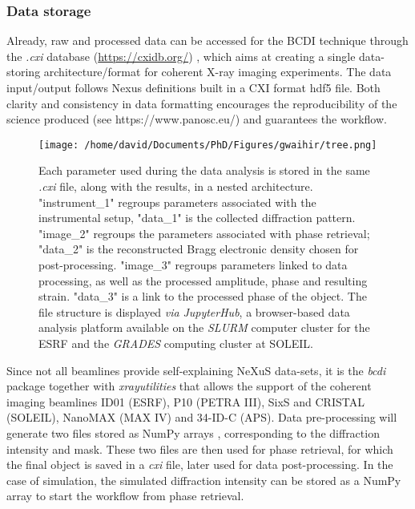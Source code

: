 \subsubsection{Data storage}

Already, raw and processed data can be accessed for the BCDI technique through the \textit{.cxi} database (\url{https://cxidb.org/}) \parencite{Maia2012}, which aims at creating a single data-storing architecture/format for coherent X-ray imaging experiments.
The data input/output follows Nexus definitions \parencite{Konnecke2015} built in a CXI format hdf5 file.
Both clarity and consistency in data formatting encourages the reproducibility of the science produced (see https://www.panosc.eu/) and guarantees the workflow.

\begin{figure}[!htb]
    \centering
    \texttt{[image: /home/david/Documents/PhD/Figures/gwaihir/tree.png]}
    \caption{
    Each parameter used during the data analysis is stored in the same \textit{.cxi} file, along with the results, in a  nested architecture.
    "instrument\_1" regroups parameters associated with the instrumental setup, "data\_1" is the collected diffraction pattern.
    "image\_2" regroups the parameters associated with phase retrieval; "data\_2" is the reconstructed Bragg electronic density chosen for post-processing.
    "image\_3" regroups parameters linked to data processing, as well as the processed amplitude, phase and resulting strain. "data\_3" is a link to the processed phase of the object.
    The file structure is displayed \textit{via} \textit{JupyterHub}, a browser-based data analysis platform available on the \textit{SLURM} computer cluster for the ESRF and the \textit{GRADES} computing cluster at SOLEIL.
    }
    \label{fig:TREE}
\end{figure}

Since not all beamlines provide self-explaining NeXuS data-sets, it is the \textit{bcdi} package together with \textit{xrayutilities} \cite{kriegner_xrayutilities_2013} that allows the support of the coherent imaging beamlines ID01 (ESRF), P10 (PETRA III), SixS and CRISTAL (SOLEIL), NanoMAX (MAX IV) and 34-ID-C (APS).
Data pre-processing will generate two files stored as NumPy arrays \cite{NumPy}, corresponding to the diffraction intensity and mask.
These two files are then used for phase retrieval, for which the final object is saved in a \textit{cxi} file, later used for data post-processing.
In the case of simulation, the simulated diffraction intensity can be stored as a NumPy array to start the workflow from phase retrieval.

